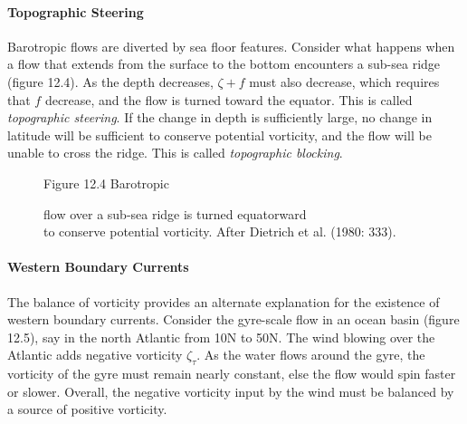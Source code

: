 \paragraph{Topographic Steering} Barotropic flows are diverted by sea
floor features. Consider what happens when a flow that extends from
the surface to the bottom encounters a sub-sea ridge (figure 12.4). As
the depth decreases, $\zeta + f$ must also decrease, which requires
that $f$ decrease, and the flow is turned toward the equator. This is
called \textit{topographic steering}. If the change in depth is sufficiently large, no
change in latitude will be sufficient to conserve potential vorticity,
and the flow will be unable to cross the ridge. This is called
\textit{topographic blocking}.

\begin{figure}[h!]
\centering
\vspace{-1ex}
\footnotesize
Figure 12.4 Barotropic \rule{0pt}{3ex} flow over a sub-sea ridge is
turned equatorward\\to conserve potential vorticity. After Dietrich et
al. (1980: 333).

\label{fig:ridgevorticity}
\vspace{-3ex}
\end{figure}

\paragraph{Western Boundary Currents}
The balance of vorticity provides an alternate explanation for the
existence of western boundary currents. Consider the gyre-scale flow
in an ocean basin (figure 12.5), say in the north Atlantic from
10\degrees N to 50\degrees N. The wind blowing over the Atlantic adds
negative vorticity $\zeta_{\tau}$. As the water flows around the gyre,
the vorticity of the gyre must remain nearly constant, else the flow
would spin faster or slower. Overall, the negative vorticity input by
the wind must be balanced by a source of positive vorticity.

